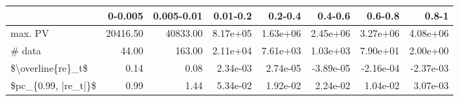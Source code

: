 \begin{tabular}{lrrrrrrr}
\toprule
{} &   0-0.005 &  0.005-0.01 &  0.01-0.2 &   0.2-0.4 &   0.4-0.6 &   0.6-0.8 &     0.8-1 \\
\midrule
max. PV             &  20416.50 &    40833.00 &  8.17e+05 &  1.63e+06 &  2.45e+06 &  3.27e+06 &  4.08e+06 \\
\# data              &     44.00 &      163.00 &  2.11e+04 &  7.61e+03 &  1.03e+03 &  7.90e+01 &  2.00e+00 \\
\$\textbackslash overline\{re\}\_t\$   &      0.14 &        0.08 &  2.34e-03 &  2.74e-05 & -3.89e-05 & -2.16e-04 & -2.37e-03 \\
\$pc\_\{0.99, |re\_t|\}\$ &      0.99 &        1.44 &  5.34e-02 &  1.92e-02 &  2.24e-02 &  1.04e-02 &  3.07e-03 \\
\bottomrule
\end{tabular}
